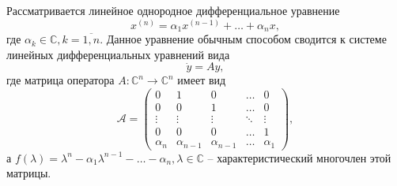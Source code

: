 Рассматривается линейное однородное дифференциальное уравнение
$$
	x^{(n)} = \alpha_{1}x^{(n-1)} + \ldots + \alpha_{n}x, 
$$
где $\alpha_{k} \in \mathbb{C}, k = \overline{1,n}$. Данное уравнение обычным способом сводится к системе
линейных дифференциальных уравнений вида
$$
	\dot{y} = Ay,
$$
где матрица оператора $A: \mathbb{C}^n \to \mathbb{C}^n$ имеет вид
$$
	\mathcal{A} = \begin{pmatrix}
		0 & 1 & 0 & \dots & 0 \\
		0 & 0 & 1 & \dots & 0 \\
		\vdots & \vdots & \vdots & \ddots & \vdots \\
		0 & 0 & 0 & \dots & 1 \\
		\alpha_n & \alpha_{n-1} & \alpha_{n-1} & \dots & \alpha_1
	\end{pmatrix},
$$
а $f(\lambda) = \lambda^{n} - \alpha_{1}\lambda^{n-1} - \ldots - \alpha_{n}, \lambda \in \mathbb{C}$ -- характеристический многочлен этой матрицы.